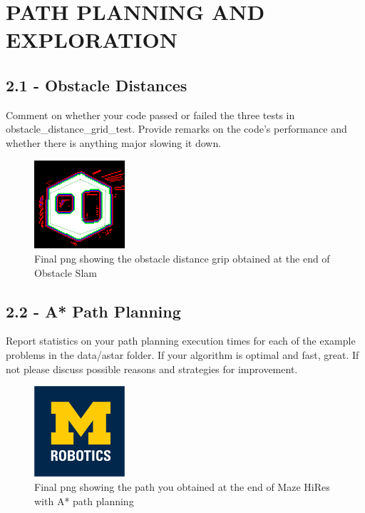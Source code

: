 \documentclass[journal,twocolumn]{IEEEtran}
\begin{document}
\section{PATH PLANNING AND EXPLORATION}

\subsection*{2.1 - Obstacle Distances} 

Comment on whether your code passed or failed the three tests in obstacle\_distance\_grid\_test. Provide remarks on the code’s performance and whether there is anything major slowing it down.

\begin{figure}[H]
\centering
\includegraphics[width=0.3\textwidth]{Media/21.png}
\caption{Final png showing the obstacle distance grip obtained at the end of Obstacle Slam}
\end{figure}


\subsection*{2.2 - A* Path Planning} 

Report statistics on your path planning execution times for each of the example problems in the data/astar folder. If your algorithm is optimal and fast, great. If not please discuss possible reasons and strategies for improvement.

\begin{figure}[H]
\centering
\includegraphics[width=0.3\textwidth]{Media/template-robotics.jpg}
\caption{Final png showing the path you obtained at the end of Maze HiRes with A* path planning}
\end{figure}
\end{document}
